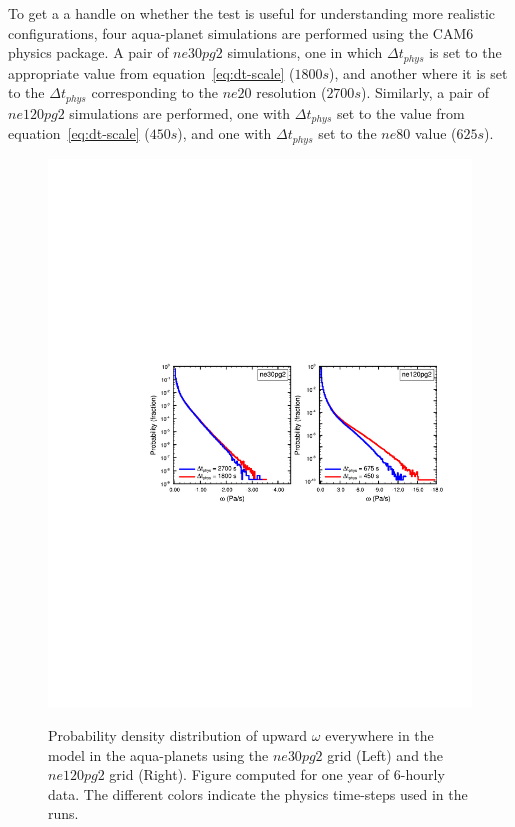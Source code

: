 \documentclass{agujournal}
\begin{document}
To get a a handle on whether the test is useful for understanding more realistic configurations, four aqua-planet simulations are performed using the CAM6 physics package. A pair of $ne30pg2$ simulations, one in which $\Delta t_{phys}$ is set to the appropriate value from equation~\ref{eq:dt-scale} ($1800s$), and another where it is set to the $\Delta t_{phys}$ corresponding to the $ne20$ resolution ($2700s$). Similarly, a pair of $ne120pg2$ simulations are performed, one with $\Delta t_{phys}$ set to the value from equation~\ref{eq:dt-scale} ($450s$), and one with $\Delta t_{phys}$ set to the $ne80$ value ($625s$). 

\begin{figure}[t]
\begin{center}
\noindent\includegraphics[width=30pc,angle=0]{figs/panel_pdf_dtphys.pdf}\\
\end{center}
\caption{Probability density distribution of upward $\omega$ everywhere in the model in the aqua-planets using the $ne30pg2$ grid (Left) and the $ne120pg2$ grid (Right). Figure computed for one year of 6-hourly data. The different colors indicate the physics time-steps used in the runs.}
\label{fig:pdf-dtphys}
\end{figure}
\end{document}
